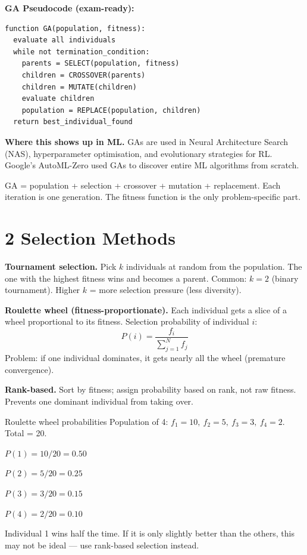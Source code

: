 \documentclass[a4paper,11pt]{article}
\begin{document}
\textbf{GA Pseudocode (exam-ready):}
\begin{verbatim}
function GA(population, fitness):
  evaluate all individuals
  while not termination_condition:
    parents = SELECT(population, fitness)
    children = CROSSOVER(parents)
    children = MUTATE(children)
    evaluate children
    population = REPLACE(population, children)
  return best_individual_found
\end{verbatim}

\textbf{Where this shows up in ML.} GAs are used in Neural Architecture Search (NAS), hyperparameter optimisation, and evolutionary strategies for RL. Google's AutoML-Zero used GAs to discover entire ML algorithms from scratch.

\begin{keytake}
GA = population + selection + crossover + mutation + replacement. Each iteration is one generation. The fitness function is the only problem-specific part.
\end{keytake}

\section{2 \quad Selection Methods}

\textbf{Tournament selection.} Pick $k$ individuals at random from the population. The one with the highest fitness wins and becomes a parent. Common: $k=2$ (binary tournament). Higher $k$ = more selection pressure (less diversity).

\textbf{Roulette wheel (fitness-proportionate).} Each individual gets a slice of a wheel proportional to its fitness. Selection probability of individual $i$:
\[
P(i) = \frac{f_i}{\sum_{j=1}^{N} f_j}
\]
Problem: if one individual dominates, it gets nearly all the wheel (premature convergence).

\textbf{Rank-based.} Sort by fitness; assign probability based on rank, not raw fitness. Prevents one dominant individual from taking over.

\begin{worked}{Roulette wheel probabilities}
Population of 4: $f_1=10,\ f_2=5,\ f_3=3,\ f_4=2$. Total = 20.
\begin{steps}
  \item $P(1) = 10/20 = 0.50$
  \item $P(2) = 5/20 = 0.25$
  \item $P(3) = 3/20 = 0.15$
  \item $P(4) = 2/20 = 0.10$
\end{steps}
Individual 1 wins half the time. If it is only slightly better than the others, this may not be ideal — use rank-based selection instead.
\end{worked}
\end{document}
